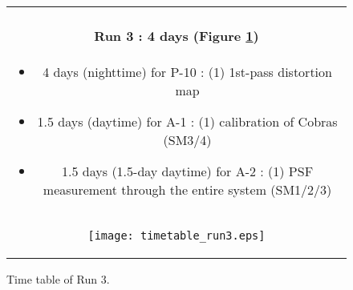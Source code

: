 \begin{figure}[!ht]
\begin{center}
\begin{tabular}{c}
\begin{minipage}{0.95\hsize}
\paragraph{Run 3 : 4 days  (Figure \ref{fig:run3})}
	\begin{itemize}
	\item 4 days (nighttime) for P-10 : 
	(1) 1st-pass distortion map
	\item 1.5 days (daytime) for A-1 : 
	(1) calibration of Cobras (SM3/4)
	\item 1.5 days (1.5-day daytime) for A-2 : 
	(1) PSF measurement through the entire system (SM1/2/3)
	\end{itemize}
\end{minipage} \\
\begin{minipage}{0.8\hsize}
	\begin{center}
	\vspace*{5mm}
	\texttt{[image: timetable\_run3.eps]}
	\end{center}
	\vspace*{-5mm}
	\caption{Time table of Run 3.}
	\label{fig:run3}
\end{minipage}
\end{tabular}
\end{center}
\end{figure}

